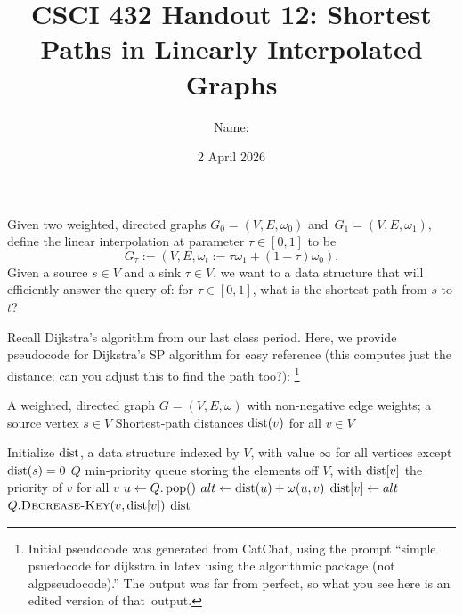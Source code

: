 \documentclass{article}
\title{CSCI 432 Handout 12: Shortest Paths in Linearly Interpolated Graphs}
\date{2 April 2026}
\author{Name: \rule{3in}{0.15mm}}
\begin{document}
\maketitle

\begin{prob}
    Given two weighted, directed graphs $G_0=(V,E,\omega_0)$
    and~$G_1=(V,E,\omega_1)$, define the linear interpolation at parameter $\tau \in
    [0,1]$ to be $$G_{\tau}:=(V,E,\omega_t := \tau\omega_1 + (1-\tau)\omega_0).$$
    Given a source $s \in V$ and a sink $\tau \in V$, we want to a data structure that will efficiently
    answer the query of: for $\tau \in [0,1]$, what is the shortest path from $s$ to
    $t$?
\end{prob}

Recall Dijkstra's algorithm from our last class period.
Here, we provide pseudocode for Dijkstra's SP algorithm for easy reference (this
computes just the distance; can you adjust this to find the path too?):%
\footnote{Initial pseudocode was generated from CatChat, using
the prompt ``simple psuedocode for dijkstra in latex using the algorithmic
package (not algpseudocode).'' The output was far from perfect, so what you see
here is an edited version of that~output.}
\begin{algorithm}[H]
    \caption{Dijkstra’s Shortest‑Path Algorithm}
    \label{alg:dijkstra}
    \begin{algorithmic}[1]   %
        \REQUIRE A weighted, directed graph $G=(V,E, \omega)$ with non‑negative
        edge weights;
        a source vertex $s\in V$
        \ENSURE Shortest‑path distances $\operatorname{dist}(v)$ for all $v\in V$

        \STATE Initialize $\operatorname{dist}$, a data structure indexed by $V$, with value $\infty$ for all
            vertices except $\operatorname{dist}(s)=0$
        \STATE $Q$ min-priority queue storing the elements off $V$, with $\operatorname{dist}[v]$ the
        priority of $v$ for all $v$
            \STATE $u \leftarrow Q.\operatorname{pop}()$
                \STATE $alt \leftarrow \operatorname{dist}(u) + \omega(u,v)$
                \STATE $\operatorname{dist}[v] \leftarrow alt$
                \STATE $Q.\textsc{Decrease-Key}(v,\operatorname{dist}[v])$
                \ENDIF
            \ENDFOR
        \ENDWHILE
        \RETURN $\operatorname{dist}$
    \end{algorithmic}
\end{algorithm}
\end{document}
